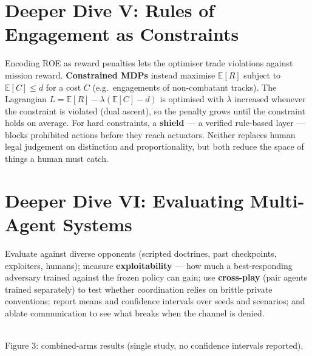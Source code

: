 \documentclass[11pt]{article}
\begin{document}
\section{Deeper Dive V: Rules of Engagement as Constraints}
Encoding ROE as reward penalties lets the optimiser trade violations against mission reward. \textbf{Constrained MDPs} instead maximise $\mathbb E[R]$ subject to $\mathbb E[C]\le d$ for a cost $C$ (e.g.\ engagements of non-combatant tracks). The Lagrangian $L=\mathbb E[R]-\lambda(\mathbb E[C]-d)$ is optimised with $\lambda$ increased whenever the constraint is violated (dual ascent), so the penalty grows until the constraint holds on average. For hard constraints, a \textbf{shield} --- a verified rule-based layer --- blocks prohibited actions before they reach actuators. Neither replaces human legal judgement on distinction and proportionality, but both reduce the space of things a human must catch.

\section{Deeper Dive VI: Evaluating Multi-Agent Systems}
Evaluate against diverse opponents (scripted doctrines, past checkpoints, exploiters, humans); measure \textbf{exploitability} --- how much a best-responding adversary trained against the frozen policy can gain; use \textbf{cross-play} (pair agents trained separately) to test whether coordination relies on brittle private conventions; report means and confidence intervals over seeds and scenarios; and ablate communication to see what breaks when the channel is denied.

\begin{center}\\{\small\color{GreyN}Figure 3: combined-arms results (single study, no confidence intervals reported).}\end{center}
\end{document}
